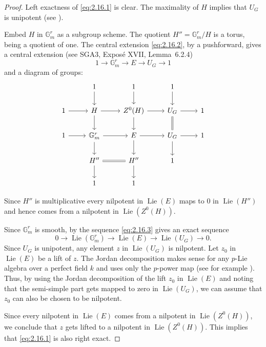 \documentclass[11pt,a4paper]{article}
\theoremstyle{plain}
\theoremstyle{definition}
\DeclareMathOperator{\Lie}{Lie}
\newcommand{\G}{\mathbb{G}}
\begin{document}
\begin{proof}
Left exactness of \eqref{eq:2.16.1} is clear. The maximality of $H$ implies that $U_G$ is unipotent (see \cite[\S2.5, page~590]{D}).

Embed $H$ in $\G_m^r$ as a subgroup scheme. The quotient $H'' = \G_m^r/H$ is a torus, being a quotient of one. The central extension \eqref{eq:2.16.2}, by a pushforward, gives a central extension (see SGA3, Expos\'e XVII, Lemma~6.2.4)
\begin{equation} \label{eq:2.16.3}
1 \to \G_m^r \to E \to U_G \to 1
\end{equation}
and a diagram of groups:
\begin{equation} \label{eq:2.16.4}
\begin{tikzcd}
& 1 \arrow[d] & 1 \arrow[d] & 1 \arrow[d] \\
1 \arrow[r] & H \arrow[r] \arrow[d] & Z^0(H) \arrow[r] \arrow[d] & U_G \arrow[r] \arrow[d,equal] & 1 \\
1 \arrow[r] & \G_m^r \arrow[r] \arrow[d] & E \arrow[r] \arrow[d] & U_G \arrow[r] \arrow[d] & 1 \\
& H'' \arrow[r,equal] \arrow[d] & H'' \arrow[d] & 1 \\
& 1 & 1
\end{tikzcd}
\end{equation}

Since $H''$ is multiplicative every nilpotent in $\Lie(E)$ maps to $0$ in $\Lie(H'')$ and hence comes from a nilpotent in $\Lie(Z^0(H))$.

Since $\G_m^r$ is smooth, by \cite[SGA3, Expos\'e VII, Proposition~8.2]{SGA3} the sequence \eqref{eq:2.16.3} gives an exact sequence
\begin{equation} \label{eq:2.16.5}
0 \to \Lie(\G_m^r) \to \Lie(E) \to \Lie(U_G) \to 0.
\end{equation}
Since $U_G$ is unipotent, any element $z$ in $\Lie(U_G)$ is nilpotent. Let $z_0$ in $\Lie(E)$ be a lift of $z$. The Jordan decomposition makes sense for any $p$-Lie algebra over a perfect field $k$ and uses only the $p$-power map (see for example \cite[Corollary~4.5.9, page~135]{W2}). Thus, by using the Jordan decomposition of the lift $z_0$ in $\Lie(E)$ and noting that the semi-simple part gets mapped to zero in $\Lie(U_G)$, we can assume that $z_0$ can also be chosen to be nilpotent.

Since every nilpotent in $\Lie(E)$ comes from a nilpotent in $\Lie(Z^0(H))$, we conclude that $z$ gets lifted to a nilpotent in $\Lie(Z^0(H))$. This implies that \eqref{eq:2.16.1} is also right exact. \qedhere
\end{proof}
\end{document}
